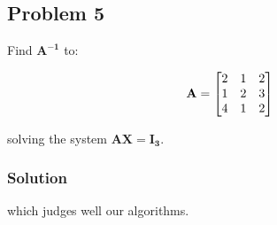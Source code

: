 \subsection{Problem 5}
Find $\mathbf{A^{-1}}$ to:

\begin{equation*}
    \mathbf{A} = 
    \begin{bmatrix}
        2 & 1 & 2 \\
        1 & 2 & 3 \\
        4 & 1 & 2 
    \end{bmatrix}
\end{equation*}

solving the system $\mathbf{AX=I_{3}}$.

\subsubsection*{Solution}

which judges well our algorithms.